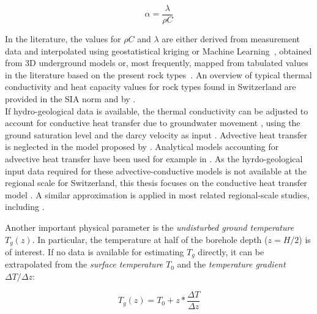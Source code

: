 \begin{equation}
\label{eq:alpha}
    \alpha = \frac{\lambda}{\rho C}
\end{equation}

In the literature, the values for $\rho C$ and $\lambda$ are either derived from measurement data and interpolated using geostatistical kriging \cite{tian_improved_2020,munoz_estimating_2015} or Machine Learning~\cite{assouline_machine_2019}, obtained from 3D underground models \cite{garcia-gil_gis-supported_2015,groupe_de_travail_pgg_evaluation_2011-1} or, most frequently, mapped from tabulated values in the literature based on the present rock types~\cite{perego_techno-economic_2019,galgaro_empirical_2015,casasso_g.pot:_2016,gemelli_gis-based_2011}. An overview of typical thermal conductivity and heat capacity values for rock types found in Switzerland are provided in the SIA norm \cite{sia_sondes_2010} and by \cite{pahud_geothermal_2002}.
\\

If hydro-geological data is available, the thermal conductivity can be adjusted to account for conductive heat transfer due to groundwater movement \cite{viesi_gis-supported_2018,assouline_machine_2019}, using the ground saturation level and the darcy velocity as input \cite{viesi_gis-supported_2018}. 
Advective heat transfer is neglected in the model proposed by \citet{eskilson_thermal_1987}.
Analytical models accounting for advective heat transfer have been used for example in \cite{garcia-gil_gis-supported_2015,alcaraz_advection_2016,alcaraz_t-i-ger_2017,attard_novel_2020}.
As the hyrdo-geological input data required for these advective-conductive models is not available at the regional scale for Switzerland, this thesis focuses on the conductive heat transfer model \cite{claesson_conductive_1988}. A similar approximation is applied in most related regional-scale studies, including \cite{perego_techno-economic_2019,galgaro_empirical_2015,casasso_g.pot:_2016,rivera_increased_2017,schiel_gis-based_2016}.

Another important physical parameter is the \textit{undisturbed ground temperature} $T_g(z)$. In particular, the temperature at half of the borehole depth ($z = H/2$) is of interest. If no data is available for estimating $T_g$ directly, it can be extrapolated from the \textit{surface temperature} $T_0$ and the \textit{temperature gradient} $\Delta T/\Delta z$: 

\begin{equation}
\label{eq:Tg}
    T_g(z) = T_0 + z * \frac{\Delta T}{\Delta z}
\end{equation}

